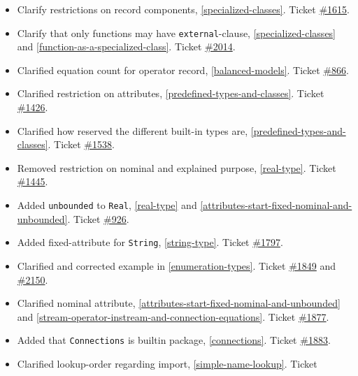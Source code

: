 \begin{itemize}
\item
  Clarify restrictions on record components, \cref{specialized-classes}. Ticket
  \href{https://github.com/modelica/ModelicaSpecification/issues/1615}{\#1615}.
\item
  Clarify that only functions may have \lstinline!external!-clause, \cref{specialized-classes} and \cref{function-as-a-specialized-class}.
  Ticket \href{https://github.com/modelica/ModelicaSpecification/issues/2014}{\#2014}.
\item
  Clarified equation count for operator record, \cref{balanced-models}. Ticket
  \href{https://github.com/modelica/ModelicaSpecification/issues/866}{\#866}.
\item
  Clarified restriction on attributes, \cref{predefined-types-and-classes}. Ticket
  \href{https://github.com/modelica/ModelicaSpecification/issues/1426}{\#1426}.
\item
  Clarified how reserved the different built-in types are, \cref{predefined-types-and-classes}.
  Ticket \href{https://github.com/modelica/ModelicaSpecification/issues/1538}{\#1538}.
\item
  Removed restriction on nominal and explained purpose, \cref{real-type}.
  Ticket \href{https://github.com/modelica/ModelicaSpecification/issues/1445}{\#1445}.
\item
  Added \lstinline!unbounded! to \lstinline!Real!, \cref{real-type} and \cref{attributes-start-fixed-nominal-and-unbounded}.
  Ticket \href{https://github.com/modelica/ModelicaSpecification/issues/926}{\#926}.
\item
  Added fixed-attribute for \lstinline!String!, \cref{string-type}.
  Ticket \href{https://github.com/modelica/ModelicaSpecification/issues/1797}{\#1797}.
\item
  Clarified and corrected example in \cref{enumeration-types}. Ticket
  \href{https://github.com/modelica/ModelicaSpecification/issues/1849}{\#1849} and
  \href{https://github.com/modelica/ModelicaSpecification/issues/2150}{\#2150}.
\item
  Clarified nominal attribute, \cref{attributes-start-fixed-nominal-and-unbounded}
  and \cref{stream-operator-instream-and-connection-equations}. Ticket
  \href{https://github.com/modelica/ModelicaSpecification/issues/1877}{\#1877}.
\item
  Added that \lstinline!Connections! is builtin package, \cref{connections}. Ticket
  \href{https://github.com/modelica/ModelicaSpecification/issues/1883}{\#1883}.
\item
  Clarified lookup-order regarding import, \cref{simple-name-lookup}. Ticket

\end{itemize}
